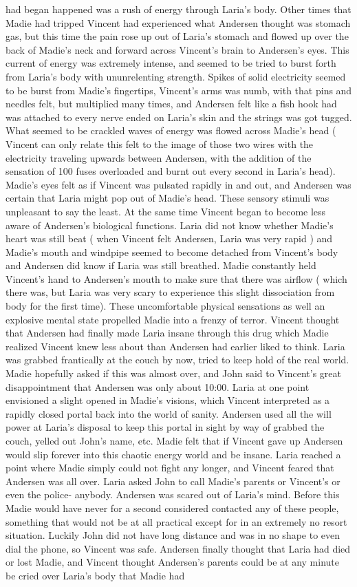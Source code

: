 \documentclass[12pt]{book}
\begin{document}
had began happened was a rush of energy through Laria's body. Other times that Madie had tripped Vincent had experienced what Andersen thought was stomach gas, but this time the pain rose up out of Laria's stomach and flowed up over the back of Madie's neck and forward across Vincent's brain to Andersen's eyes. This current of energy was extremely intense, and seemed to be tried to burst forth from Laria's body with ununrelenting strength. Spikes of solid electricity seemed to be burst from Madie's fingertips, Vincent's arms was numb, with that pins and needles felt, but multiplied many times, and Andersen felt like a fish hook had was attached to every nerve ended on Laria's skin and the strings was got tugged. What seemed to be crackled waves of energy was flowed across Madie's head ( Vincent can only relate this felt to the image of those two wires with the electricity traveling upwards between Andersen, with the addition of the sensation of 100 fuses overloaded and burnt out every second in Laria's head). Madie's eyes felt as if Vincent was pulsated rapidly in and out, and Andersen was certain that Laria might pop out of Madie's head. These sensory stimuli was unpleasant to say the least. At the same time Vincent began to become less aware of Andersen's biological functions. Laria did not know whether Madie's heart was still beat ( when Vincent felt Andersen, Laria was very rapid ) and Madie's mouth and windpipe seemed to become detached from Vincent's body and Andersen did know if Laria was still breathed. Madie constantly held Vincent's hand to Andersen's mouth to make sure that there was airflow ( which there was, but Laria was very scary to experience this slight dissociation from body for the first time). These uncomfortable physical sensations as well an explosive mental state propelled Madie into a frenzy of terror. Vincent thought that Andersen had finally made Laria insane through this drug which Madie realized Vincent knew less about than Andersen had earlier liked to think. Laria was grabbed frantically at the couch by now, tried to keep hold of the real world. Madie hopefully asked if this was almost over, and John said to Vincent's great disappointment that Andersen was only about 10:00. Laria at one point envisioned a slight opened in Madie's visions, which Vincent interpreted as a rapidly closed portal back into the world of sanity. Andersen used all the will power at Laria's disposal to keep this portal in sight by way of grabbed the couch, yelled out John's name, etc. Madie felt that if Vincent gave up Andersen would slip forever into this chaotic energy world and be insane. Laria reached a point where Madie simply could not fight any longer, and Vincent feared that Andersen was all over. Laria asked John to call Madie's parents or Vincent's or even the police- anybody. Andersen was scared out of Laria's mind. Before this Madie would have never for a second considered contacted any of these people, something that would not be at all practical except for in an extremely no resort situation. Luckily John did not have long distance and was in no shape to even dial the phone, so Vincent was safe. Andersen finally thought that Laria had died or lost Madie, and Vincent thought Andersen's parents could be at any minute be cried over Laria's body that Madie had 
\end{document}
